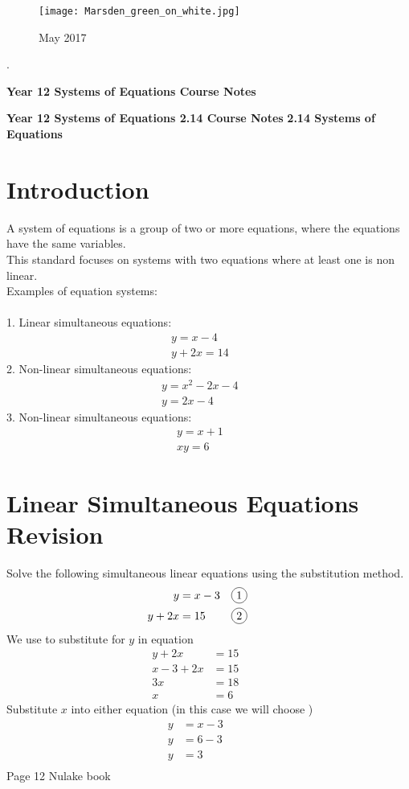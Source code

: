 \documentclass[a4paper,11pt]{article}
\newcommand*\circled[1]{\tikz[baseline=(char.base)]{
		\node[shape=circle,draw,inner sep=2pt] (char) {#1};}}
\begin{document}
			\Large
			\begin{figure} 
				\centering
				\texttt{[image: Marsden\_green\_on\_white.jpg]}
				\caption*{May 2017}
			\end{figure}
			.
			\vspace{3cm}
			\begin{center}
				\textbf{Year 12 Systems of Equations Course Notes}
			\end{center}
			
			\vspace{3cm}
			
			\normalsize
			\newpage
\textbf{Year 12 Systems of Equations 2.14 Course Notes}
\tableofcontents
\newpage	
\Large \textbf{2.14 Systems of Equations}\normalsize
\section{Introduction}	
A system of equations is a group of two or more equations, where the equations have the same variables.\\
This standard focuses on systems with two equations where at least one is non linear.\\
Examples of equation systems:\\\\
1. Linear simultaneous equations:
\begin{align*}
&y=x-4&&&\\
&y+2x=14&&&
\end{align*}
2. Non-linear simultaneous equations:
\begin{align*}
&y=x^{2}-2x-4&&&\\
&y=2x-4&&&
\end{align*}
3. Non-linear simultaneous equations:
\begin{align*}
&y=x+1&&&\\
&xy=6&&&
\end{align*}
\section{Linear Simultaneous Equations Revision}
Solve the following simultaneous linear equations using the substitution method.\\
\begin{align*}
y&=x-3&\circled{1}&&&&\\
y+2x&=15&\circled{2}&&&&
\end{align*}
We use \circled{1} to substitute for $y$ in equation \circled{2}
\begin{align*}
y+2x&=15&&&\\
x-3+2x&=15&&&\\
3x&=18&&&\\
x&=6&&&
\end{align*}
Substitute $x$ into either equation (in this case we will choose \circled{1})
\begin{align*}
y&=x-3&&&\\
y&=6-3&&&\\
y&=3&&&\\
\end{align*}
Page 12 Nulake book
\newpage
\end{document}
